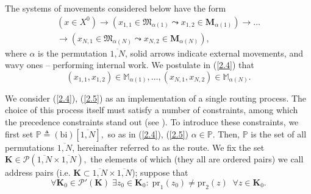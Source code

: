 \documentclass[numbers,sort&compress]{IntechOpen-Book}%
\begin{document}
The systems of movements considered below have the form
\begin{equation}\label{2.4}
  \begin{aligned}
    (x \in X^0)
    \to
    (x_{1,1} \in \mathfrak{M}_{\alpha(1)} \leadsto x_{1,2} \in \mathbf{M}_{\alpha(1)})
    \to \dots \\
    \to
    (x_{N,1} \in \mathfrak{M}_{\alpha(N)} \leadsto x_{N,2} \in \mathbf{M}_{\alpha(N)}),
  \end{aligned}
\end{equation}
where
$\alpha$ is the permutation $\overline{1,N}$,
solid arrows indicate external movements,
and wavy ones -- performing internal work.
We postulate in (\ref{2.4}) that
\begin{equation}\label{2.5}
  (x_{1,1},x_{1,2}) \in \mathbb{M}_{\alpha(1)},
  \dots,
  (x_{N,1},x_{N,2}) \in \mathbb{M}_{\alpha(N)}.
\end{equation}

We consider
 (\ref{2.4}), (\ref{2.5})
as an implementation of a single routing process.
The choice of this process itself must satisfy
a number of constraints,
among which the precedence constraints stand out
(see \cite{10}).
To introduce these constraints,
we first set
$\mathbb{P} {\triangleq} (
  \mathrm{bi})[\overline{1,N}],$
so as in (\ref{2.4}), (\ref{2.5})
$\alpha \in \mathbb{P}$.
Then,
$\mathbb{P}$
is the set of all permutations
$\overline{1,N}$,
hereinafter referred to as the route.
We fix the set
$\mathbf{K} \in \mathcal{P}(\overline{1,N} \times \overline{1,N}),$
the elements of which
(they all are ordered pairs)
we call address pairs
(i.e. $\mathbf{K} \subset \overline{1,N} \times \overline{1,N}$);
suppose that
\begin{equation}\label{2.6}
\forall{\mathbf{K}_0} \in \mathcal{P}'(\mathbf{K})\;\exists{z_0} \in \mathbf{K}_0:\;\mathrm{pr}_1(z_0)
\ne \mathrm{pr}_2(z)\;\;\forall{z} \in \mathbf{K}_0.
\end{equation}
\end{document}
